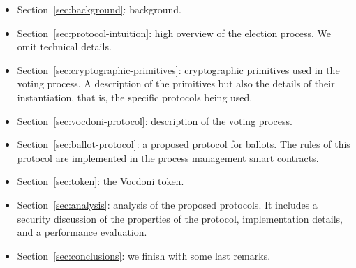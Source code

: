 \begin{itemize}
	\item Section~\ref{sec:background}: background.
	\item Section~\ref{sec:protocol-intuition}: high overview of the election process. We omit technical details.
	\item Section~\ref{sec:cryptographic-primitives}: cryptographic primitives used in the voting process. A description of the primitives but also the details of their instantiation, that is, the specific protocols being used.
	\item Section~\ref{sec:vocdoni-protocol}: description of the voting process.
	\item Section~\ref{sec:ballot-protocol}: a proposed protocol for ballots. The rules of this protocol are implemented in the process management smart contracts.
	\item Section~\ref{sec:token}: the Vocdoni token.
	\item Section~\ref{sec:analysis}: analysis of the proposed protocols. It includes a security discussion of the properties of the protocol, implementation details, and a performance evaluation.
	\item Section~\ref{sec:conclusions}: we finish with some last remarks.
\end{itemize}